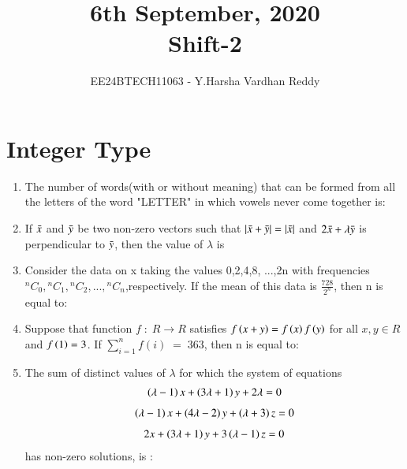 \documentclass[journal,,12pt,onecolumn]{IEEEtran}
\theoremstyle{remark}
\begin{document}

\vspace{3cm}

\title{6th September, 2020\\Shift-2}
\author{EE24BTECH11063 - Y.Harsha Vardhan Reddy}
\maketitle

\bigskip

\renewcommand{\thefigure}{\theenumi}
\renewcommand{\thetable}{\theenumi}


\section*{Integer Type}
\begin{enumerate}
 \item The number of words(with or without meaning) that can be formed from all the letters of the word "LETTER" in which vowels never come together is:
 \item If $\Bar{x}$ and $\Bar{y}$ be two non-zero vectors such that $|\Bar{x}+\Bar{y}|=|\Bar{x}|$ and $2\Bar{x}+\lambda \Bar{y}$ is perpendicular to $\Bar{y}$, then the value of $\lambda$ is
 \item Consider the data on x taking the values 0,2,4,8, ...,2n with frequencies ${}^{n}C_{0}
,{}^{n}C_{1},{}^{n}C_{2}, ...,{}^{n}C_{n}$,respectively. If the mean of this data is $\frac{728}{2^n}$, then n is equal to:
 \item Suppose that function $f\;:\;R\rightarrow R$ satisfies $f\left(x+y\right)=f\left(x\right)f\left(y\right)$ for all $x,y \in R$ and $f\left(1\right)=3$. If $\sum_{i=1}^{n} f(i)\;=\;363$, then n is equal to:

 \item The sum of distinct values of $\lambda$ for which the system of equations 
 \begin{align*}
     \left(\lambda -1\right)x +\left(3\lambda+1\right)y+2\lambda =0
 \end{align*}
 \begin{align*}
     \left(\lambda -1\right)x +\left(4\lambda-2\right)y+\left(\lambda+3\right)z =0
 \end{align*}
 \begin{align*}
     2x +\left(3\lambda+1\right)y+3\left(\lambda-1\right)z =0
 \end{align*}
 has non-zero solutions, is :
 \end{enumerate}
 
\end{document}
